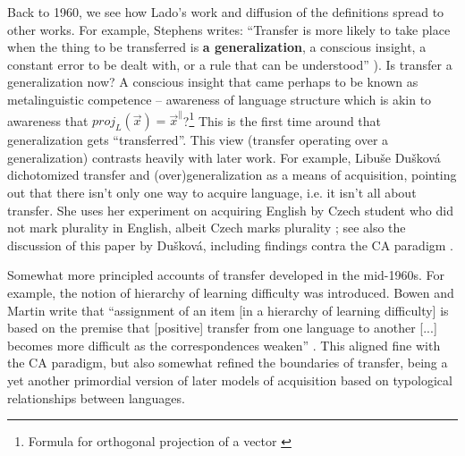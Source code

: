 \documentclass{article}
\begin{document}
Back to 1960, we see how Lado’s work and diffusion of the definitions spread to other works. For example, Stephens writes: ``Transfer is more likely to take place when the thing to be transferred is \textbf{a generalization}, a conscious insight, a constant error to be dealt with, or a rule that can be understood'' \citep[][p. 1542, emphasis added]{stephens_transfer_1960}). Is transfer a generalization now? A conscious insight that came perhaps to be known as metalinguistic competence -- awareness of language structure which is akin to awareness that $proj_L(\Vec{x})=\Vec{x}^{\parallel}$?\footnote{Formula for orthogonal projection of a vector \citep[from][p. 61]{bretscher_linear_2018}} This is the first time around that generalization gets ``transferred''. This view (transfer operating over a generalization) contrasts heavily with later work. For example, Libuše Dušková dichotomized transfer and (over)generalization as a means of acquisition, pointing out that there isn’t only one way to acquire language, i.e. it isn’t all about transfer. She uses her experiment on acquiring English by Czech student who did not mark plurality in English, albeit Czech marks plurality \citep{duskova_sources_1969}; see also the discussion of this paper by Dušková, including findings contra the CA paradigm  \citep[][pp.. 14-17]{flynn_parameter-setting_1987}. 

Somewhat more principled accounts of transfer developed in the mid-1960s. For example, the notion of hierarchy of learning difficulty was introduced. Bowen and Martin write that ``assignment of an item [in a hierarchy of learning difficulty] is based on the premise that [positive] transfer from one language to another [...] becomes more difficult as the correspondences weaken'' \citep[][p. 292]{stockwell_grammatical_1965}. This aligned fine with the CA paradigm, but also somewhat refined the boundaries of transfer, being a yet another primordial version of later models of acquisition based on typological relationships between languages. 
\end{document}
